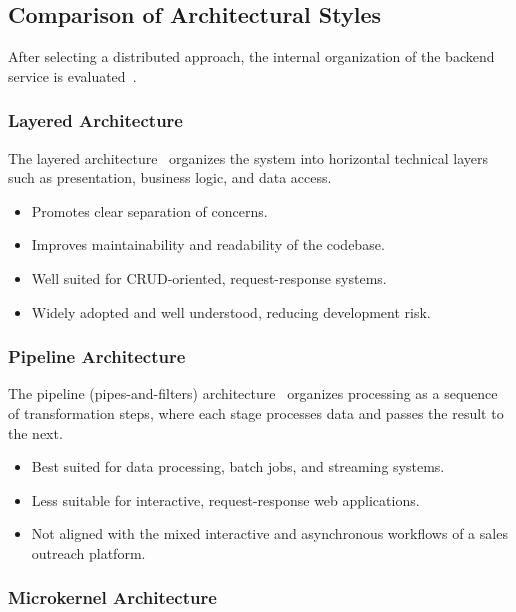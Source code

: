 \documentclass[a4paper]{article}
\begin{document}
\subsection{Comparison of Architectural Styles}

After selecting a distributed approach, the internal organization 
of the backend service is 
evaluated~\cite{richards2020fundamentals}.

\subsubsection{Layered Architecture}

The layered architecture~\cite{richards2020fundamentals} organizes 
the system into horizontal technical layers such as presentation, 
business logic, and data access.

\begin{itemize}
    \item Promotes clear separation of concerns.
    \item Improves maintainability and readability of the codebase.
    \item Well suited for CRUD-oriented, request-response systems.
    \item Widely adopted and well understood, reducing development 
    risk.
\end{itemize}

\subsubsection{Pipeline Architecture}

The pipeline (pipes-and-filters) 
architecture~\cite{richards2020fundamentals} organizes processing 
as a sequence of transformation steps, where each stage processes 
data and passes the result to the next.

\begin{itemize}
    \item Best suited for data processing, batch jobs, and streaming 
    systems.
    \item Less suitable for interactive, request-response web 
    applications.
    \item Not aligned with the mixed interactive and asynchronous 
    workflows of a sales outreach platform.
\end{itemize}

\subsubsection{Microkernel Architecture}
\end{document}
